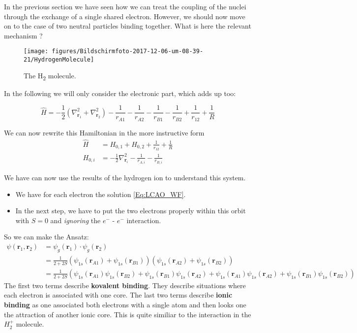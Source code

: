 \documentclass[10pt]{article}
\begin{document}
In the previous section we have seen how we can treat the coupling of the nuclei through the exchange of a single shared electron. However, we should now move on to the case of two neutral particles binding together. What is here the relevant mechanism ?
\begin{figure}[h!]
\begin{center}
\texttt{[image: figures/Bildschirmfoto-2017-12-06-um-08-39-21/HydrogenMolecule]}
\caption{{The H\textsubscript{2} molecule.
{\label{546428}}%
}}
\end{center}
\end{figure}



In the following we will only consider the electronic part, which adds up too:

\begin{equation}
\hat{H} = -\frac{1}{2}\left(\nabla_{\mathbf{r}_1}^2+\nabla_{\mathbf{r}_2}^2\right)-\frac{1}{r_{A1}}-\frac{1}{r_{A2}}-\frac{1}{r_{B1}}-\frac{1}{r_{B2}}+\frac{1}{r_{12}}+\frac{1}{R}
\end{equation}

We can now rewrite this Hamiltonian in the more instructive form
\begin{eqnarray}
\hat{H} &= H_{0,1}+H_{0,2}+\frac{1}{r_{12}}+\frac{1}{R}\\
H_{0,i} &= -\frac{1}{2}\nabla_{\mathbf{r}_i}^2-\frac{1}{r_{A,i}}-\frac{1}{r_{B,i}}
\end{eqnarray}

We have can now use the results of the hydrogen ion to understand this system.

\begin{itemize}
\item We have for each electron the solution \eqref{Eq:LCAO_WF}.
\item In the next step, we have to put the two electrons properly within this orbit with $S=0$ and \textit{ignoring} the $e^-$ - $e^-$ interaction.
\end{itemize}
So we can make the Ansatz:
\begin{eqnarray}
\psi(\mathbf{r}_1, \mathbf{r}_2) &= \psi_{g}(\mathbf{r}_1)\cdot\psi_{g}(\mathbf{r}_2)\\
&= \frac{1}{2 + 2S}\left(\psi_{1s}(\mathbf{r}_{A1})+\psi_{1s}(\mathbf{r}_{B1})\right)\left(\psi_{1s}(\mathbf{r}_{A2})+\psi_{1s}(\mathbf{r}_{B2})\right)\\
&= \frac{1}{2 + 2S}\left(\psi_{1s}(\mathbf{r}_{A1})\psi_{1s}(\mathbf{r}_{B2})+\psi_{1s}(\mathbf{r}_{B1})\psi_{1s}(\mathbf{r}_{A2}) +\psi_{1s}(\mathbf{r}_{A1})\psi_{1s}(\mathbf{r}_{A2})+\psi_{1s}(\mathbf{r}_{B1})\psi_{1s}(\mathbf{r}_{B2}) \right)
\end{eqnarray}
The first two terms describe \textbf{kovalent binding}. They describe situations where each electron is associated with one core.  The last two terms describe \textbf{ionic binding} as one associated both electrons with a single atom and then looks one the attraction of another ionic core. This is quite similiar to the interaction in the $H_2^+$ molecule.
\end{document}
